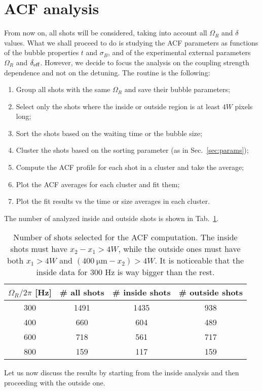 \section{ACF analysis}
From now on, all shots will be considered, taking into account all $\Omega_R$ and $\delta$ values. What we shall proceed to do is studying the ACF parameters as functions of the bubble properties $t$ and $\sigma_B$, and of the experimental external parameters $\Omega_R$ and $\delta_{\rm eff}$. However, we decide to focus the analysis on the coupling strength dependence and not on the detuning.
The routine is the following:
\begin{enumerate}
    \item Group all shots with the same $\Omega_R$ and save their bubble parameters;
    \item Select only the shots where the inside or outside region is at least $4W$ pixels long;
    \item Sort the shots based on the waiting time or the bubble size;
    \item Cluster the shots based on the sorting parameter (as in Sec.\ \ref{sec:params});
    \item Compute the ACF profile for each shot in a cluster and take the average;
    \item Plot the ACF averages for each cluster and fit them;
    \item Plot the fit results vs the time or size averages in each cluster.
\end{enumerate}
The number of analyzed inside and outside shots is shown in Tab.\ \ref{tab:shots}.
\begin{table}[ht!]
    \centering
    \begin{tabular}{c|c|c|c}
        $\Omega_R/2\pi$ [\unit{\hertz}] & \# all shots & \# inside shots & \# outside shots \\
        \hline
        300 & 1491 & 1435 & 938\\   
        400 & 660 & 604 & 489\\
        600 & 718 & 561 & 717\\
        800 & 159 & 117 & 159\\     
    \end{tabular}
    \caption{Number of shots selected for the ACF computation. The inside shots must have $x_2-x_1 > 4W$, while the outside ones must have both $x_1 > 4W$ and $(400\ \unit{\micro\meter} - x_2) > 4W$. It is noticeable that the inside data for 300 \unit{\hertz} is way bigger than the rest.}
    \label{tab:shots}
\end{table}
Let us now discuss the results by starting from the inside analysis and then proceeding with the outside one.

